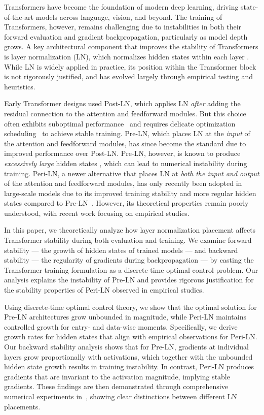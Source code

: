 \documentclass[journal]{IEEEtran}
\theoremstyle{plain}
\theoremstyle{definition}
\theoremstyle{remark}
\begin{document}
Transformers have become the foundation of modern deep learning, driving state-of-the-art models across language, vision, and beyond. The training of Transformers, however, remains challenging due to instabilities in both their forward evaluation and gradient backpropagation, particularly as model depth grows. A key architectural component that improves the stability of Transformers is layer normalization (LN), which normalizes hidden states within each layer \cite{ba2016layernormalization,xiong2020layer}. While LN is widely applied in practice, its position within the Transformer block  is not rigorously justified, and has evolved largely through empirical testing and heuristics. 

Early Transformer designs used Post-LN, which applies LN \emph{after} adding the residual connection to the attention and feedforward modules. But this choice often exhibits suboptimal performance~\cite{xiong2020layer,kim2025peri} and requires delicate optimization scheduling~\cite{Popel2018TrainingTF,liu2019variance} to achieve stable training. Pre-LN, which places LN at the \emph{input} of the attention and feedforward modules, has since become the standard due to improved performance over Post-LN. Pre-LN, however, is known to produce \emph{excessively large} hidden states \cite{dettmers2022gptint,yu2024super,sun2024massive,fishman2025scaling,kim2025peri}, which can lead to numerical instability during training. Peri-LN, a newer alternative that places LN at \emph{both the input and output} of the attention and feedforward modules, has only recently been adopted in large-scale models due to its improved training stability and more regular hidden states compared to Pre-LN~\cite{kim2025peri}. However, its theoretical properties remain poorly understood, with recent work focusing on empirical studies. 

In this paper, we theoretically analyze how layer normalization placement affects Transformer stability during both evaluation and training. We examine forward stability --- the growth of hidden states of trained models --- and backward stability --- the regularity of gradients during backpropagation --- by casting the Transformer training formulation as a discrete-time optimal control problem. Our analysis explains the instability of Pre-LN and provides rigorous justification for the stability properties of Peri-LN observed in empirical studies. 

Using discrete-time optimal control theory, we show that the optimal solution for Pre-LN architectures grow unbounded in magnitude, while Peri-LN maintains controlled growth for entry- and data-wise moments. Specifically, we derive growth rates for hidden states that align with empirical observations for Peri-LN. Our backward stability analysis shows that for Pre-LN, gradients at individual layers grow proportionally with activations, which together with the unbounded hidden state growth results in training instability. In contrast, Peri-LN produces gradients that are invariant to the activation magnitude, implying stable gradients. These findings are then demonstrated through comprehensive numerical experiments in~, showing clear distinctions between different LN placements.
\end{document}
